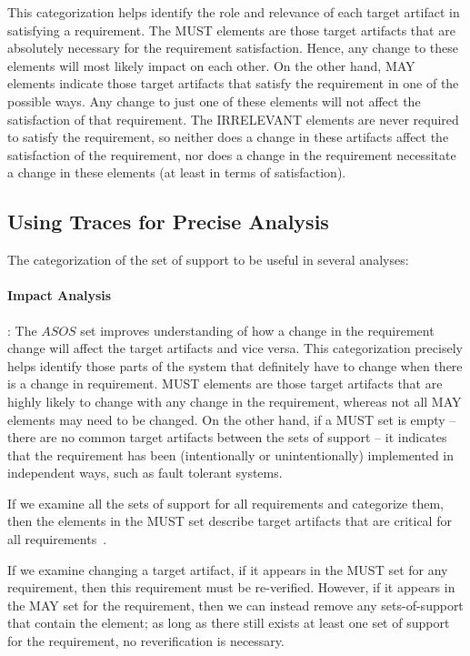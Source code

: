This categorization helps identify the role and relevance of each target artifact in satisfying a requirement. The MUST elements are those target artifacts that are absolutely necessary for the requirement satisfaction. Hence, any change to these elements will most likely impact on each other. On the other hand, MAY elements indicate those target artifacts that satisfy the requirement in one of the possible ways.  Any change to just one of these elements will not affect the satisfaction of that requirement. The IRRELEVANT elements are never required to satisfy the requirement, so neither does a change in these artifacts affect the satisfaction of the requirement, nor does a change in the requirement necessitate a change in these elements (at least in terms of satisfaction).


\subsection{Using Traces for Precise Analysis}

The categorization of the set of support to be useful in several analyses:

\paragraph{Impact Analysis}: The $ASOS$ set improves understanding of how a change in the requirement change will affect the target artifacts and vice versa. This categorization precisely helps identify those parts of the system that definitely have to change when there is a change in requirement. MUST elements are those target artifacts that are highly likely to change with any change in the requirement, whereas not all MAY elements may need to be changed. On the other hand, if a MUST set is empty -- there are no common target artifacts between the sets of support -- it indicates that the requirement has been (intentionally or unintentionally) implemented in independent ways, such as fault tolerant systems. 



If we examine all the sets of support for all requirements and categorize them, then the elements in the MUST set describe target artifacts that are critical for all requirements~.  %


If we examine changing a target artifact, if it appears in the MUST set for any requirement, then this requirement must be re-verified.  However, if it appears in the MAY set for the requirement, then we can instead remove any sets-of-support that contain the element; as long as there still exists at least one set of support for the requirement, no reverification is necessary.

